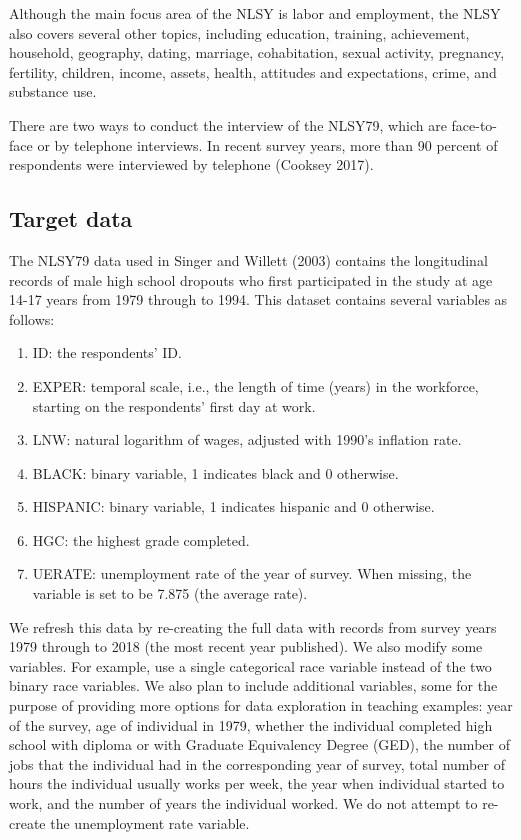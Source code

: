 \documentclass{article}
\begin{document}
Although the main focus area of the NLSY is labor and employment, the NLSY also covers several other topics, including education, training, achievement, household, geography, dating, marriage, cohabitation, sexual activity, pregnancy, fertility, children, income, assets, health, attitudes and expectations, crime, and substance use.

There are two ways to conduct the interview of the NLSY79, which are face-to-face or by telephone interviews. In recent survey years, more than 90 percent of respondents were interviewed by telephone (Cooksey 2017).

\hypertarget{target}{%
\subsection{Target data}\label{target}}

The NLSY79 data used in Singer and Willett (2003) contains the longitudinal records of male high school dropouts who first participated in the study at age 14-17 years from 1979 through to 1994. This dataset contains several variables as follows:

\begin{enumerate}
\def\labelenumi{\arabic{enumi}.}
\tightlist
\item
  ID: the respondents' ID.
\item
  EXPER: temporal scale, i.e., the length of time (years) in the workforce, starting on the respondents' first day at work.
\item
  LNW: natural logarithm of wages, adjusted with 1990's inflation rate.
\item
  BLACK: binary variable, 1 indicates black and 0 otherwise.
\item
  HISPANIC: binary variable, 1 indicates hispanic and 0 otherwise.
\item
  HGC: the highest grade completed.
\item
  UERATE: unemployment rate of the year of survey. When missing, the variable is set to be 7.875 (the average rate).
\end{enumerate}

We refresh this data by re-creating the full data with records from survey years 1979 through to 2018 (the most recent year published). We also modify some variables. For example, use a single categorical race variable instead of the two binary race variables. We also plan to include additional variables, some for the purpose of providing more options for data exploration in teaching examples: year of the survey, age of individual in 1979, whether the individual completed high school with diploma or with Graduate Equivalency Degree (GED), the number of jobs that the individual had in the corresponding year of survey, total number of hours the individual usually works per week, the year when individual started to work, and the number of years the individual worked. We do not attempt to re-create the unemployment rate variable.
\end{document}

